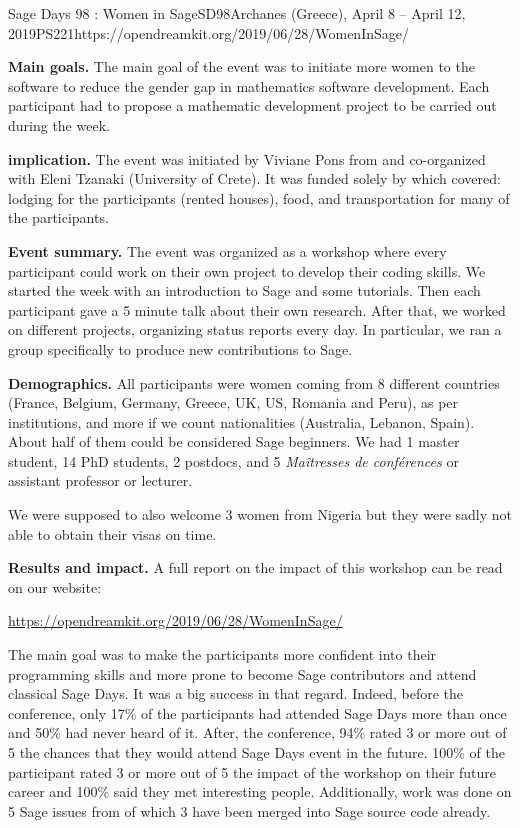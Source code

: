 \begin{event}{Sage Days 98 : Women in Sage}{SD98}{Archanes (Greece), April 8 -- April 12, 2019}{PS}{22}{1}{https://opendreamkit.org/2019/06/28/WomenInSage/}

\textbf{Main goals.} The main goal of the event was to initiate more women to the software \Sage to reduce the gender gap in mathematics software
development. Each participant had to propose a mathematic development project to be carried out during the week.

\textbf{\ODK implication.} The event was initiated by Viviane Pons from \ODK and co-organized with Eleni Tzanaki (University of Crete). It was funded solely by \ODK which covered: lodging for the participants (rented houses), food, and transportation for many of the participants.

\textbf{Event summary.} The event was organized as a workshop where every participant could work on their own project to develop their coding skills. We started the week with an introduction to Sage and some tutorials. Then each participant gave a 5 minute talk about their own research. After that, we worked on different projects, organizing status reports every day. In particular, we ran a group specifically to produce new contributions to Sage.

\textbf{Demographics.} All participants were women coming from 8 different countries (France, Belgium, Germany, Greece, UK, US, Romania and Peru), as per institutions, and more if we count nationalities (Australia, Lebanon, Spain). About half of them could be considered Sage beginners. We had 1 master student, 14 PhD students, 2 postdocs, and 5 \textit{Maîtresses de conférences} or assistant professor or lecturer.

We were supposed to also welcome 3 women from Nigeria but they were sadly not able to obtain their visas on time.

\textbf{Results and impact.} A full report on the impact of this
workshop can be read on our website:
\centerline{\url{https://opendreamkit.org/2019/06/28/WomenInSage/}}
The main goal was to make the participants more confident into their programming skills and more prone to become Sage contributors and attend classical Sage Days. It was a big success in that regard. Indeed, before the conference, only 17\% of the participants had attended Sage Days more than once and 50\% had never heard of it. After, the conference, 94\% rated 3 or more out of 5 the chances that they would attend Sage Days event in the future. 100\% of the participant rated 3 or more out of 5 the impact of the workshop on their future career and 100\% said they met interesting people. Additionally, work was done on 5 Sage issues from of which 3 have been merged into Sage source code already.


\end{event}
